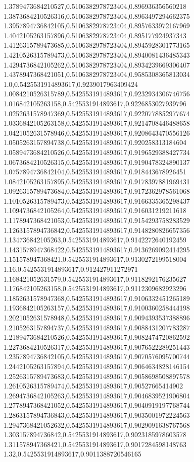 1.3789473684210527,0.5106382978723404,0.896936356560218
1.3873684210526316,0.5106382978723404,0.8963497294662375
1.3957894736842105,0.5106382978723404,0.8957633972167969
1.4042105263157896,0.5106382978723404,0.895177924937343
1.4126315789473685,0.5106382978723404,0.8945928301773165
1.4210526315789473,0.5106382978723404,0.8940081436485343
1.4294736842105262,0.5106382978723404,0.8934239669306407
1.4378947368421051,0.5106382978723404,0.9585308365813034
1.0,0.5425531914893617,0.9239017963409424
1.0084210526315789,0.5425531914893617,0.9232934306746756
1.016842105263158,0.5425531914893617,0.9226853027939796
1.0252631578947369,0.5425531914893617,0.9220778852977674
1.0336842105263158,0.5425531914893617,0.9214708446488658
1.0421052631578946,0.5425531914893617,0.9208643470556126
1.0505263157894738,0.5425531914893617,0.920258313184604
1.0589473684210526,0.5425531914893617,0.9196529388427734
1.0673684210526315,0.5425531914893617,0.9190478324890137
1.0757894736842104,0.5425531914893617,0.918443678926451
1.0842105263157895,0.5425531914893617,0.9178397881969431
1.0926315789473684,0.5425531914893617,0.9172362978561068
1.1010526315789473,0.5425531914893617,0.9166335365298437
1.1094736842105264,0.5425531914893617,0.916031219211618
1.1178947368421053,0.5425531914893617,0.9154293758283529
1.1263157894736842,0.5425531914893617,0.9148280826657356
1.134736842105263,0.5425531914893617,0.9142272640192459
1.1431578947368422,0.5425531914893617,0.9136269092414295
1.151578947368421,0.5425531914893617,0.9130272199518004
1.16,0.5425531914893617,0.912427911272971
1.168421052631579,0.5425531914893617,0.9118292176235627
1.176842105263158,0.5425531914893617,0.9112309682923296
1.1852631578947368,0.5425531914893617,0.9106332451265189
1.1936842105263157,0.5425531914893617,0.9100360258444198
1.2021052631578948,0.5425531914893617,0.9094393537388896
1.2105263157894737,0.5425531914893617,0.9088431207783287
1.2189473684210526,0.5425531914893617,0.9082474720862592
1.2273684210526317,0.5425531914893617,0.9076522289251443
1.2357894736842105,0.5425531914893617,0.9070576095700744
1.2442105263157894,0.5425531914893617,0.9064634828146154
1.2526315789473683,0.5425531914893617,0.9058698508897578
1.2610526315789474,0.5425531914893617,0.90527665414902
1.2694736842105263,0.5425531914893617,0.9046839521906804
1.2778947368421052,0.5425531914893617,0.9040919197768744
1.2863157894736843,0.5425531914893617,0.9035001972224563
1.2947368421052632,0.5425531914893617,0.9029091638767568
1.303157894736842,0.5425531914893617,0.9023185978603578
1.311578947368421,0.5425531914893617,0.9017284598148763
1.32,0.5425531914893617,0.9011388720546165
